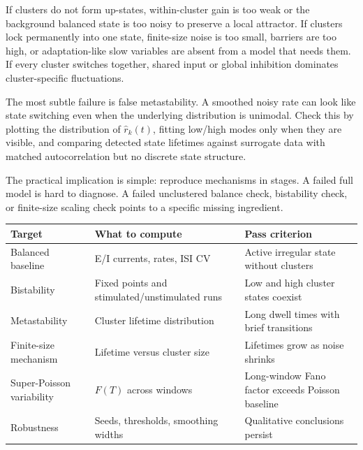 If clusters do not form up-states, within-cluster gain is too weak or the background balanced state is too noisy to preserve a local attractor. If clusters lock permanently into one state, finite-size noise is too small, barriers are too high, or adaptation-like slow variables are absent from a model that needs them. If every cluster switches together, shared input or global inhibition dominates cluster-specific fluctuations.

The most subtle failure is false metastability. A smoothed noisy rate can look like state switching even when the underlying distribution is unimodal. Check this by plotting the distribution of $\widehat r_k(t)$, fitting low/high modes only when they are visible, and comparing detected state lifetimes against surrogate data with matched autocorrelation but no discrete state structure.

The practical implication is simple: reproduce mechanisms in stages. A failed full model is hard to diagnose. A failed unclustered balance check, bistability check, or finite-size scaling check points to a specific missing ingredient.

\begin{chaptersummary}

\begin{center}
\renewcommand{\arraystretch}{1.45}
\begin{tabularx}{\textwidth}{@{}l X X@{}}
  \toprule
  \textbf{Target} & \textbf{What to compute} & \textbf{Pass criterion} \\
  \midrule
  Balanced baseline & E/I currents, rates, ISI CV & Active irregular state without clusters \\
  Bistability & Fixed points and stimulated/unstimulated runs & Low and high cluster states coexist \\
  Metastability & Cluster lifetime distribution & Long dwell times with brief transitions \\
  Finite-size mechanism & Lifetime versus cluster size & Lifetimes grow as noise shrinks \\
  Super-Poisson variability & $F(T)$ across windows & Long-window Fano factor exceeds Poisson baseline \\
  Robustness & Seeds, thresholds, smoothing widths & Qualitative conclusions persist \\
  \bottomrule
\end{tabularx}
\end{center}

\end{chaptersummary}

